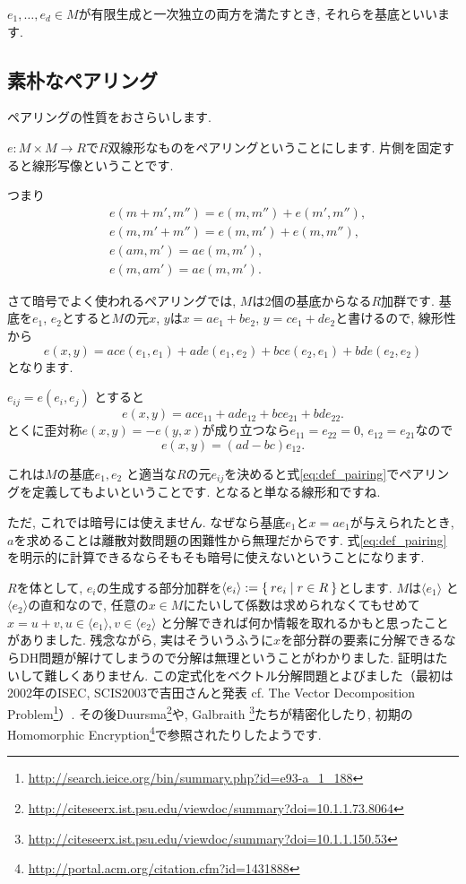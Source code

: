 \documentclass{jsarticle}
\theoremstyle{definition}
\numberwithin{theorem}{section}
\begin{document}
$e_1, \ldots, e_d\in M$が有限生成と一次独立の両方を満たすとき, それらを基底といいます.

\subsection{素朴なペアリング}
ペアリングの性質をおさらいします.

$e: M\times M \rightarrow R$で$R$双線形なものをペアリングということにします.
片側を固定すると線形写像ということです.

つまり
\begin{align*}
& e(m+m', m'') = e(m, m'') + e(m', m''),\\
& e(m, m'+m'') = e(m, m') + e(m, m''),\\
& e(am, m') = ae(m, m'),\\
& e(m, am') = ae(m, m').
\end{align*}

さて暗号でよく使われるペアリングでは, $M$は2個の基底からなる$R$加群です. 基底を$e_1$, $e_2$とすると$M$の元$x$, $y$は$x = ae_1+be_2$,
$y = ce_1 + de_2$と書けるので, 線形性から
\[
e(x, y) = ac e(e_1, e_1) + ad e(e_1, e_2) + bc e(e_2, e_1) + bd e(e_2, e_2)
\]
となります.

$e_{ij} = e(e_i, e_j)$ とすると
\begin{equation}
\label{eq:def_pairing}
e(x, y) = ac e_{11} + ad e_{12} + bc e_{21} + bd e_{22}.
\end{equation}
とくに歪対称$e(x, y)=-e(y,x)$が成り立つなら$e_{11}=e_{22}=0$, $e_{12}=e_{21}$なので
\[
e(x,y)=(ad-bc)e_{12}.
\]

これは$M$の基底$e_1, e_2$ と適当な$R$の元$e_{ij}$を決めると式\ref{eq:def_pairing}でペアリングを定義してもよいということです.
となると単なる線形和ですね.

ただ, これでは暗号には使えません. なぜなら基底$e_1$と$x = ae_1$が与えられたとき, $a$を求めることは離散対数問題の困難性から無理だからです.
式\ref{eq:def_pairing}を明示的に計算できるならそもそも暗号に使えないということになります.

$R$を体として, $e_i$の生成する部分加群を$\langle e_i \rangle := \Set{re_i | r \in R}$とします. $M$は$\langle e_1\rangle$
と$\langle e_2\rangle$の直和なので, 任意の$x\in M$にたいして係数は求められなくてもせめて$x = u+v, u \in \langle e_1\rangle, v \in \langle e_2\rangle$
と分解できれば何か情報を取れるかもと思ったことがありました. 残念ながら, 実はそういうふうに$x$を部分群の要素に分解できるならDH問題が解けてしまうので分解は無理ということがわかりました.
証明はたいして難しくありません. この定式化をベクトル分解問題とよびました（最初は2002年のISEC, SCIS2003で吉田さんと発表 cf.
The Vector Decomposition Problem\footnote{\url{http://search.ieice.org/bin/summary.php?id=e93-a_1_188}}）.
その後Duursma\footnote{\url{http://citeseerx.ist.psu.edu/viewdoc/summary?doi=10.1.1.73.8064}}や, Galbraith
\footnote{\url{http://citeseerx.ist.psu.edu/viewdoc/summary?doi=10.1.1.150.53}}たちが精密化したり,
初期のHomomorphic Encryption\footnote{\url{http://portal.acm.org/citation.cfm?id=1431888}}で参照されたりしたようです.
\end{document}
